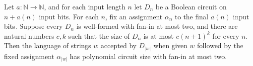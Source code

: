 \begin{theorem}
\label{Language.InPPoly.of_hardwire}
\leanok
{}
Let $a : \mathbb{N} \to \mathbb{N}$, and for each input length $n$ let $D_n$ be a
Boolean circuit on $n+a(n)$ input bits. For each $n$, fix an assignment $\alpha_n$ to
the final $a(n)$ input bits. Suppose every $D_n$ is well-formed with fan-in at most two,
and there are natural numbers $c,k$ such that the size of $D_n$ is at most $c(n+1)^k$
for every $n$. Then the language of strings $w$ accepted by $D_{|w|}$ when given $w$
followed by the fixed assignment $\alpha_{|w|}$ has polynomial circuit size with fan-in
at most two.
\end{theorem}
